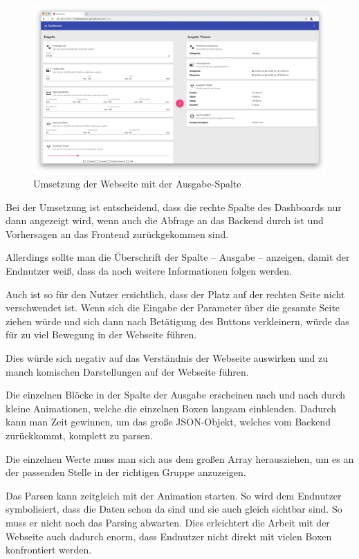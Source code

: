 \begin{figure}[h]
    \centering
    \includegraphics[width=\textwidth]{images/kapitel_4/website_output.png}
    \caption{Umsetzung der Webseite mit der Ausgabe-Spalte}
    \label{fig:umsetzung_website_output}
\end{figure}

Bei der Umsetzung ist entscheidend, dass die rechte Spalte des Dashboards nur dann angezeigt wird, wenn auch die Abfrage
an das Backend durch ist und Vorhersagen an das Frontend zurückgekommen sind.

Allerdings sollte man die Überschrift der Spalte -- Ausgabe -- anzeigen, damit der Endnutzer weiß, dass da noch weitere
Informationen folgen werden.

Auch ist so für den Nutzer ersichtlich, dass der Platz auf der rechten Seite nicht verschwendet ist. Wenn sich die
Eingabe der Parameter über die gesamte Seite ziehen würde und sich dann nach Betätigung des Buttons verkleinern, würde
das für zu viel Bewegung in der Webseite führen.

Dies würde sich negativ auf das Verständnis der Webseite auswirken und zu manch komischen Darstellungen auf der Webseite
führen.

Die einzelnen Blöcke in der Spalte der Ausgabe erscheinen nach und nach durch kleine Animationen, welche die einzelnen
Boxen langsam einblenden. Dadurch kann man Zeit gewinnen, um das große JSON-Objekt, welches vom Backend zurückkommt,
komplett zu parsen.

Die einzelnen Werte muss man sich aus dem großen Array herausziehen, um es an der passenden Stelle in der richtigen
Gruppe anzuzeigen.

Das Parsen kann zeitgleich mit der Animation starten. So wird dem Endnutzer symbolisiert, dass die Daten schon da sind
und sie auch gleich sichtbar sind. So muss er nicht noch das Parsing abwarten. Dies erleichtert die Arbeit mit der
Webseite auch dadurch enorm, dass Endnutzer nicht direkt mit vielen Boxen konfrontiert werden.

